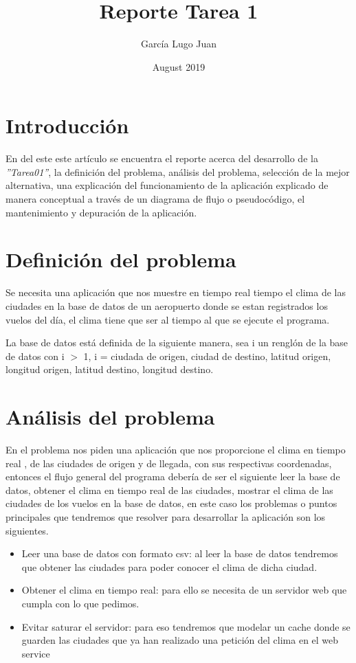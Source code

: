 \documentclass{article}
\title{Reporte Tarea 1}
\author{García Lugo Juan}
\date{August 2019}
\begin{document}
\maketitle
\section{Introducción}
En del  este este artículo se encuentra el reporte acerca del desarrollo de la \textsl{''Tarea01''}, la definición del problema, análisis del problema, selección de la mejor alternativa, una explicación del funcionamiento de la aplicación explicado de manera conceptual a través de un diagrama de flujo o pseudocódigo, el mantenimiento y depuración de la aplicación.
\section{Definición del problema}
Se necesita una aplicación que nos muestre en tiempo real tiempo el clima de las ciudades en la base de datos de un aeropuerto donde se estan registrados los vuelos del día, el clima tiene que ser al tiempo al que se ejecute el programa.

La base de datos está definida de la siguiente manera, sea i un renglón de la base de datos con i $>$ 1, i = ciudada de origen, ciudad de destino, latitud origen, longitud origen, latitud destino, longitud destino.
\section{Análisis del problema}
En el problema nos piden una aplicación que nos proporcione el clima en tiempo real , de las ciudades de origen y de llegada, con sus respectivas coordenadas, entonces el flujo general del programa debería de ser el siguiente leer la base de datos, obtener el clima en tiempo real de las ciudades, mostrar el clima de las ciudades de los vuelos en la base de datos, en este caso los   problemas o puntos principales que tendremos que resolver para desarrollar la aplicación son los siguientes.
\begin{itemize}
    \item Leer una base de datos con formato csv: al leer la base de datos tendremos que obtener las ciudades para poder conocer el clima de dicha ciudad.
    \item Obtener el clima en tiempo real: para ello se necesita de un servidor web que cumpla con lo que pedimos.
    \item Evitar saturar el servidor: para eso tendremos que modelar un cache donde se guarden las ciudades que ya han realizado una petición del clima en el web service
\end{itemize}
\end{document}
